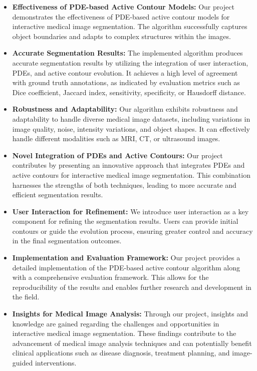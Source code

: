 \documentclass[]{report}
\begin{document}
\begin{itemize}
\item \textbf{Effectiveness of PDE-based Active Contour Models:} Our project demonstrates the effectiveness of PDE-based active contour models for interactive medical image segmentation. The algorithm successfully captures object boundaries and adapts to complex structures within the images.

\item \textbf{Accurate Segmentation Results:} The implemented algorithm produces accurate segmentation results by utilizing the integration of user interaction, PDEs, and active contour evolution. It achieves a high level of agreement with ground truth annotations, as indicated by evaluation metrics such as Dice coefficient, Jaccard index, sensitivity, specificity, or Hausdorff distance.

\item \textbf{Robustness and Adaptability:} Our algorithm exhibits robustness and adaptability to handle diverse medical image datasets, including variations in image quality, noise, intensity variations, and object shapes. It can effectively handle different modalities such as MRI, CT, or ultrasound images.

\item \textbf{Novel Integration of PDEs and Active Contours:} Our project contributes by presenting an innovative approach that integrates PDEs and active contours for interactive medical image segmentation. This combination harnesses the strengths of both techniques, leading to more accurate and efficient segmentation results.

\item \textbf{User Interaction for Refinement:} We introduce user interaction as a key component for refining the segmentation results. Users can provide initial contours or guide the evolution process, ensuring greater control and accuracy in the final segmentation outcomes.

\item \textbf{Implementation and Evaluation Framework:} Our project provides a detailed implementation of the PDE-based active contour algorithm along with a comprehensive evaluation framework. This allows for the reproducibility of the results and enables further research and development in the field.

\item \textbf{Insights for Medical Image Analysis:} Through our project, insights and knowledge are gained regarding the challenges and opportunities in interactive medical image segmentation. These findings contribute to the advancement of medical image analysis techniques and can potentially benefit clinical applications such as disease diagnosis, treatment planning, and image-guided interventions.
\end{itemize}
\end{document}
